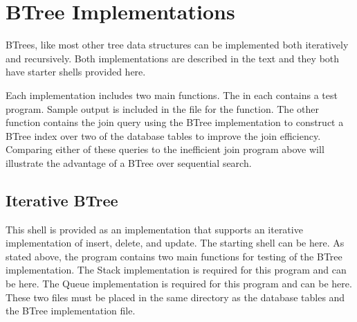 \documentclass[letterpaper,10pt,english]{sphinxmanual}
\begin{document}
\begin{sphinxVerbatim}[commandchars=\\\{\},numbers=left,firstnumber=1,stepnumber=1]
   
\end{sphinxVerbatim}


\section{B\sphinxhyphen{}Tree Implementations}
\label{\detokenize{chap10/chap10:b-tree-implementations}}
B\sphinxhyphen{}Trees, like most other tree data structures can be implemented both iteratively and recursively. Both implementations are described in the text and they both have starter shells provided here.

Each implementation includes two main functions. The  in each contains a test program. Sample output is included in the file for the  function. The other  function contains the join query using the B\sphinxhyphen{}Tree implementation to construct a B\sphinxhyphen{}Tree index over two of the database tables to improve the join efficiency. Comparing either of these queries to the inefficient join program above will illustrate the advantage of a B\sphinxhyphen{}Tree over sequential search.


\subsection{Iterative B\sphinxhyphen{}Tree}
\label{\detokenize{chap10/chap10:iterative-b-tree}}
This shell is provided as an implementation that supports an iterative implementation of insert, delete, and update. The starting shell can be  here. As stated above, the program contains two main functions for testing of the B\sphinxhyphen{}Tree implementation. The Stack implementation is required for this program and can be  here. The Queue implementation is required for this program and can be  here. These two files must be placed in the same directory as the database tables and the B\sphinxhyphen{}Tree implementation file.
\end{document}
